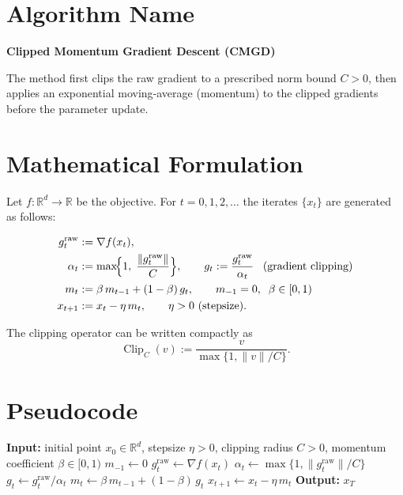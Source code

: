 \documentclass{article}
\begin{document}
\section*{Algorithm Name}
\textbf{Clipped Momentum Gradient Descent (CMGD)}  

The method first clips the raw gradient to a prescribed norm bound $C>0$, then applies an exponential moving‑average (momentum) to the clipped gradients before the parameter update.

\section*{Mathematical Formulation}
Let $f:\mathbb{R}^d\rightarrow\mathbb{R}$ be the objective.  
For $t=0,1,2,\dots$ the iterates $\{x_t\}$ are generated as follows:

\begin{align}
    g_t^{\text{raw}} &:= \nabla f(x_t), \label{eq:rawgrad}\\
    \alpha_t &:= \max\!\Bigl\{1,\;\frac{\|g_t^{\text{raw}}\|}{C}\Bigr\}, \qquad 
    g_t := \frac{g_t^{\text{raw}}}{\alpha_t}\;\;\;(\text{gradient clipping})\label{eq:clip}\\
    m_t &:= \beta\, m_{t-1} + (1-\beta)\, g_t ,\qquad m_{-1}=0,\;\; \beta\in[0,1) \label{eq:momentum}\\
    x_{t+1} &:= x_t - \eta\, m_t ,\qquad \eta>0 \text{ (stepsize)}. \label{eq:update}
\end{align}

The clipping operator can be written compactly as  
\[
\operatorname{Clip}_C(v):=\frac{v}{\max\{1,\|v\|/C\}} .
\]

\section*{Pseudocode}
\begin{algorithm}[H]
\caption{Clipped Momentum Gradient Descent}
\begin{algorithmic}[1]
\State \textbf{Input:} initial point $x_0\in\mathbb{R}^d$, stepsize $\eta>0$, clipping radius $C>0$, momentum coefficient $\beta\in[0,1)$
\State $m_{-1}\gets 0$
    \State $g^{\text{raw}}_t \gets \nabla f(x_t)$
    \State $\alpha_t \gets \max\{1,\|g^{\text{raw}}_t\|/C\}$
    \State $g_t \gets g^{\text{raw}}_t / \alpha_t$ 
    \State $m_t \gets \beta\, m_{t-1} + (1-\beta)\, g_t$
    \State $x_{t+1} \gets x_t - \eta\, m_t$
\EndFor
\State \textbf{Output:} $x_T$
\end{algorithmic}
\end{algorithm}
\end{document}
